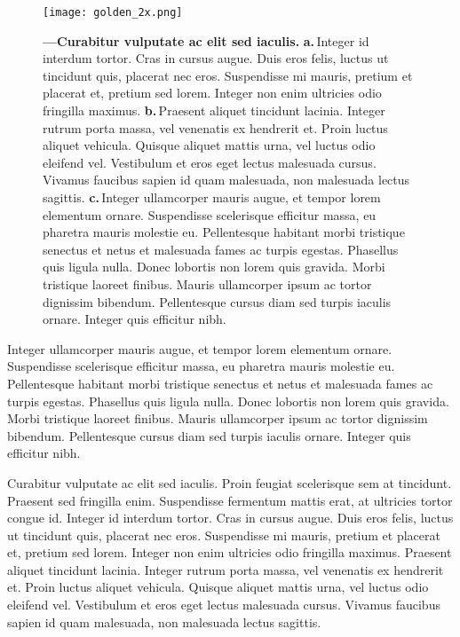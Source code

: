 \documentclass[./main.tex]{subfiles}
\begin{document}
\begin{figure}[t!] %
		\centering				
		\texttt{[image: golden\_2x.png]}		
		\caption[A standard figure]
		{ \textbf{---\;Curabitur vulputate ac elit sed iaculis.}
		\textbf{a.}\,Integer id interdum tortor. Cras in cursus augue. Duis eros felis, luctus ut tincidunt quis, placerat nec eros. Suspendisse mi mauris, pretium et placerat et, pretium sed lorem. Integer non enim ultricies odio fringilla maximus.
		\textbf{b.}\,Praesent aliquet tincidunt lacinia. Integer rutrum porta massa, vel venenatis ex hendrerit et. Proin luctus aliquet vehicula. Quisque aliquet mattis urna, vel luctus odio eleifend vel. Vestibulum et eros eget lectus malesuada cursus. Vivamus faucibus sapien id quam malesuada, non malesuada lectus sagittis. 
		\textbf{c.}\,Integer ullamcorper mauris augue, et tempor lorem elementum ornare. Suspendisse scelerisque efficitur massa, eu pharetra mauris molestie eu. Pellentesque habitant morbi tristique senectus et netus et malesuada fames ac turpis egestas. Phasellus quis ligula nulla. Donec lobortis non lorem quis gravida. Morbi tristique laoreet finibus. Mauris ullamcorper ipsum ac tortor dignissim bibendum. Pellentesque cursus diam sed turpis iaculis ornare. Integer quis efficitur nibh.
		}
		\label{fig:myfig2}  %
\end{figure}

\par Integer ullamcorper mauris augue, et tempor lorem elementum ornare. Suspendisse scelerisque efficitur massa, eu pharetra mauris molestie eu. Pellentesque habitant morbi tristique senectus et netus et malesuada fames ac turpis egestas. Phasellus quis ligula nulla. Donec lobortis non lorem quis gravida. Morbi tristique laoreet finibus. Mauris ullamcorper ipsum ac tortor dignissim bibendum. Pellentesque cursus diam sed turpis iaculis ornare. Integer quis efficitur nibh.

\par Curabitur vulputate ac elit sed iaculis. Proin feugiat scelerisque sem at tincidunt. Praesent sed fringilla enim. Suspendisse fermentum mattis erat, at ultricies tortor congue id. Integer id interdum tortor. Cras in cursus augue. Duis eros felis, luctus ut tincidunt quis, placerat nec eros. Suspendisse mi mauris, pretium et placerat et, pretium sed lorem. Integer non enim ultricies odio fringilla maximus. Praesent aliquet tincidunt lacinia. Integer rutrum porta massa, vel venenatis ex hendrerit et. Proin luctus aliquet vehicula. Quisque aliquet mattis urna, vel luctus odio eleifend vel. Vestibulum et eros eget lectus malesuada cursus. Vivamus faucibus sapien id quam malesuada, non malesuada lectus sagittis. 
\end{document}

